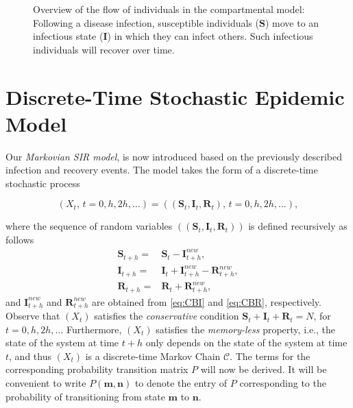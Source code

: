 \documentclass[a4paper,preprint]{elsarticle}
\renewcommand{\vec}[1]{\boldsymbol{#1}}
\begin{document}
\begin{figure}[t]
  \centering
\caption{Overview of the flow of individuals in the compartmental model:
Following a disease infection, susceptible individuals ($\vec{S}$) move to an
infectious state ($\vec{I}$) in which they can infect others. Such infectious
individuals will recover over time.}
\label{fig:flow_diagram}
\end{figure}

\section{Discrete-Time Stochastic Epidemic Model}

Our \textit{Markovian SIR model}, is now introduced based on the previously described infection and recovery events. The model takes the form of a discrete-time stochastic process 

\begin{equation}
\label{eq:SIRmodel}
  (X_{t} \mbox{, }t=0,h,2h,\ldots)=((\vec{S}_{t}, \vec{I}_{t}, \vec{R}_{t}) \mbox{, }t=0,h,2h,\ldots),  
\end{equation}

where the sequence of random variables $((\vec{S}_{t}, \vec{I}_{t}, \vec{R}_{t}))$ is defined recursively as follows
\begin{align}
\label{eq:difference_equations}
    \vec{S}_{t+h} = {} & \vec{S}_{t} - \vec{I}_{t+h}^{new}, \\
    \vec{I}_{t+h} = {} & \vec{I}_{t} + \vec{I}_{t+h}^{new} - \vec{R}_{t+h}^{new}, \\
    \vec{R}_{t+h} = {} & \vec{R}_{t} + \vec{R}_{t+h}^{new}, 
\label{eq:difference_equations_again}
\end{align}
%
and $\vec{I}_{t+h}^{new}$ and $\vec{R}_{t+h}^{new}$ are obtained from \eqref{eq:CBI} and \eqref{eq:CBR}, respectively. Observe that $(X_{t})$ satisfies the \textit{conservative} condition $\vec{S}_t+\vec{I}_t+\vec{R}_t=N$, for $t=0,h,2h,\ldots$ Furthermore, $(X_{t})$ satisfies the \textit{memory-less} property, i.e., the state of the system at time $t+h$ only depends on the state of the system at time $t$, and thus $(X_{t})$ is a discrete-time Markov Chain $\mathcal{C}$. The terms for the corresponding
probability transition matrix $P$ will now be derived. It will be convenient to write $P(\vec{m},\vec{n})$ to denote the entry of $P$ corresponding to the probability of transitioning from state $\vec{m}$ to $\vec{n}$.
\end{document}
